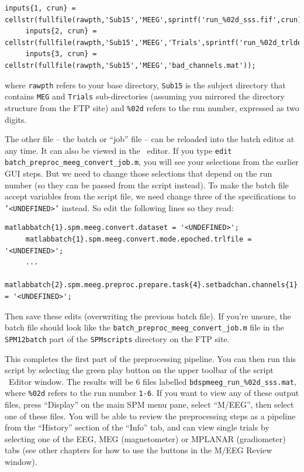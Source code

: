 \begin{lstlisting}[style=Matlab-editor,basicstyle=\mlttfamily\footnotesize]
     inputs{1, crun} = cellstr(fullfile(rawpth,'Sub15','MEEG',sprintf('run_%02d_sss.fif',crun)));
     inputs{2, crun} = cellstr(fullfile(rawpth,'Sub15','MEEG','Trials',sprintf('run_%02d_trldef.mat',crun)));
     inputs{3, crun} = cellstr(fullfile(rawpth,'Sub15','MEEG','bad_channels.mat'));
\end{lstlisting}

where \verb|rawpth| refers to your base directory, \verb|Sub15| is the subject directory that contains \texttt{MEG} and \texttt{Trials} sub-directories (assuming you mirrored the directory structure from the FTP site) and \texttt{\%02d} refers to the run number, expressed as two digits.

The other file -- the batch or ``job'' file -- can be reloaded into the batch editor at any time. It can also be viewed in the \matlab\ editor. If you type \texttt{edit batch\_preproc\_meeg\_convert\_job.m}, you will see your selections from the earlier GUI steps. But we need to change those selections that depend on the run number (so they can be passed from the script instead). To make the batch file accept variables from the script file, we need change three of the specifications to \texttt{'<UNDEFINED>'} instead. So edit the following lines so they read:

\begin{lstlisting}[style=Matlab-editor,basicstyle=\mlttfamily\footnotesize]
     matlabbatch{1}.spm.meeg.convert.dataset = '<UNDEFINED>';
     matlabbatch{1}.spm.meeg.convert.mode.epoched.trlfile = '<UNDEFINED>';
     ...
     matlabbatch{2}.spm.meeg.preproc.prepare.task{4}.setbadchan.channels{1}.chanfile = '<UNDEFINED>';
\end{lstlisting}

Then save these edits (overwriting the previous batch file). If you're unsure, the batch file should look like the \texttt{batch\_preproc\_meeg\_convert\_job.m} file in the \texttt{SPM12batch} part of the \texttt{SPMscripts} directory on the FTP site. 

This completes the first part of the preprocessing pipeline. You can then run this script by selecting the green play button on the upper toolbar of the script \matlab\ Editor window. The results will be 6 files labelled \texttt{bdspmeeg\_run\_\%02d\_sss.mat}, where \texttt{\%02d} refers to the run number \verb|1-6|. If you want to view any of these output files, press ``Display'' on the main SPM menu pane, select ``M/EEG'', then select one of these files. You will be able to review the preprocessing steps as a pipeline from the ``History'' section of the ``Info'' tab, and can view single trials by selecting one of the EEG, MEG (magnetometer) or MPLANAR (gradiometer) tabs (see other chapters for how to use the buttons in the M/EEG Review window).

